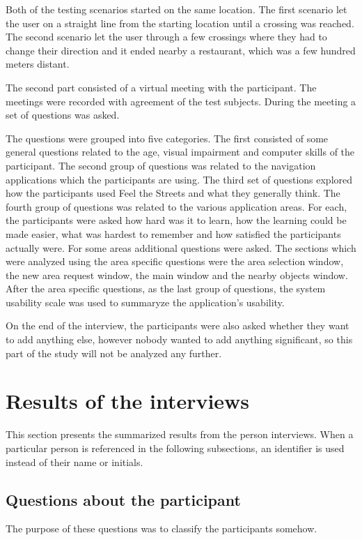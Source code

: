 \documentclass[nolof,digital]{fithesis3}
\begin{document}
Both of the testing scenarios started on the same location. The first scenario let the user on a straight line from the starting location until a crossing was reached. The second scenario let the user through a few crossings where they had to change their direction and it ended nearby a restaurant, which was a few hundred meters distant.

The second part consisted of a virtual meeting with the participant. The meetings were recorded with agreement of the test subjects. During the meeting a set of questions was asked.

The questions were grouped into five categories. The first consisted of some general questions related to the age, visual impairment and computer skills of the participant. The second group of questions was related to the navigation applications which the participants are using. The third set of questions explored how the participants used Feel the Streets and what they generally think. The fourth group of questions was related to the various application areas. For each, the participants were asked how hard was it to learn, how the learning could be made easier, what was hardest to remember and how satisfied the participants actually were. For some areas additional questions were asked. The sections which were analyzed using the area specific questions were the area selection window, the new area request window, the main window and the nearby objects window. After the area specific questions, as the last group of questions, the system usability scale \parencite{brooke1996} was used to summaryze the application's usability.

On the end of the interview, the participants were also asked whether they want to add anything else, however nobody wanted to add anything significant, so this part of the study will not be analyzed any further.
\section{Results of the interviews}
This section presents the summarized results from the person interviews. When a particular person is referenced in the following subsections, an identifier is used instead of their name or initials.
\subsection{Questions about the participant}
The purpose of these questions was to classify the participants somehow.
\end{document}
